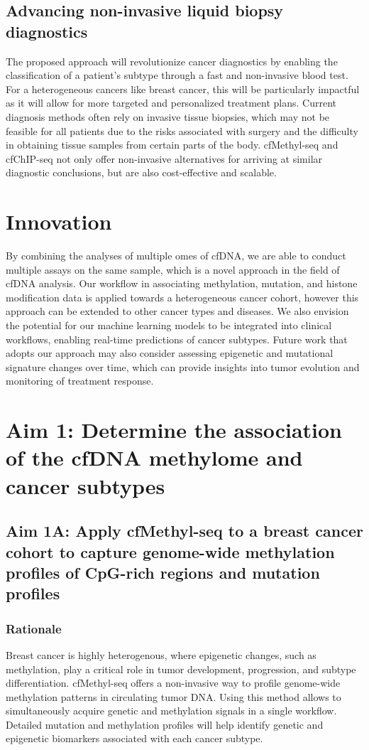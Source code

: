 \documentclass[11pt]{article}
\begin{document}
\subsection*{Advancing non-invasive liquid biopsy diagnostics} 
The proposed approach will revolutionize cancer diagnostics by enabling the
classification of a patient's subtype through a fast and non-invasive blood test.
For a heterogeneous cancers like breast cancer, this will be particularly impactful
as it will allow for more targeted and personalized treatment plans. 
Current diagnosis methods often rely on invasive tissue biopsies, 
which may not be feasible for all patients due to the risks associated with
surgery and the difficulty in obtaining tissue samples from certain parts of the body.
cfMethyl-seq and cfChIP-seq not only offer non-invasive alternatives for arriving
at similar diagnostic conclusions, but are also cost-effective and scalable.
\section*{Innovation}
By combining the analyses of multiple omes of cfDNA, we are able to conduct
multiple assays on the same sample, which is a novel approach in the field of
cfDNA analysis. Our workflow in associating methylation, mutation, and histone
modification data is applied towards a heterogeneous cancer cohort, however 
this approach can be extended to other cancer types and diseases. We also
envision the potential for our machine learning models to be integrated into
clinical workflows, enabling real-time predictions of cancer subtypes. 
Future work that adopts our approach may also consider assessing epigenetic
and mutational signature changes over time, which can provide insights into
tumor evolution and monitoring of treatment response.

\newpage
\section*{Aim 1: Determine the association of the cfDNA methylome and cancer subtypes}
\subsection*{Aim 1A: Apply cfMethyl-seq to a breast cancer cohort to capture genome-wide methylation profiles of CpG-rich regions and mutation profiles}
\subsubsection*{Rationale}
Breast cancer is highly heterogenous, where epigenetic changes, such as methylation, 
play a critical role in tumor development, progression, and subtype differentiation.
cfMethyl-seq offers a non-invasive way to profile genome-wide methylation patterns in
circulating tumor DNA. Using this method allows to simultaneously acquire genetic
and methylation signals in a single workflow.
Detailed mutation and methylation profiles will help identify genetic and epigenetic biomarkers associated with each cancer subtype.
\end{document}
